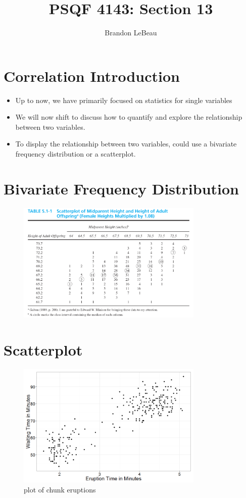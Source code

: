 \documentclass[12pt]{article}
\title{PSQF 4143: Section 13}
\author{Brandon LeBeau}
\date{}
\begin{document}
\maketitle

\section{Correlation Introduction}\label{correlation-introduction}

\begin{itemize}
\itemsep1pt\parskip0pt
\item
  Up to now, we have primarily focused on statistics for single
  variables
\item
  We will now shift to discuss how to quantify and explore the
  relationship between two variables.
\item
  To display the relationship between two variables, could use a
  bivariate frequency distribution or a scatterplot.
\end{itemize}

\section{Bivariate Frequency
Distribution}\label{bivariate-frequency-distribution}

\begin{figure}[H]
\centering
\includegraphics[width=3.5in]{bivariate_freq.png}
\caption{}
\end{figure}

\section{Scatterplot}\label{scatterplot}

\begin{figure}[H]
\centering
\includegraphics[width=3.5in]{figure/eruptions-1.png}
\caption{plot of chunk eruptions}
\end{figure}
\end{document}
